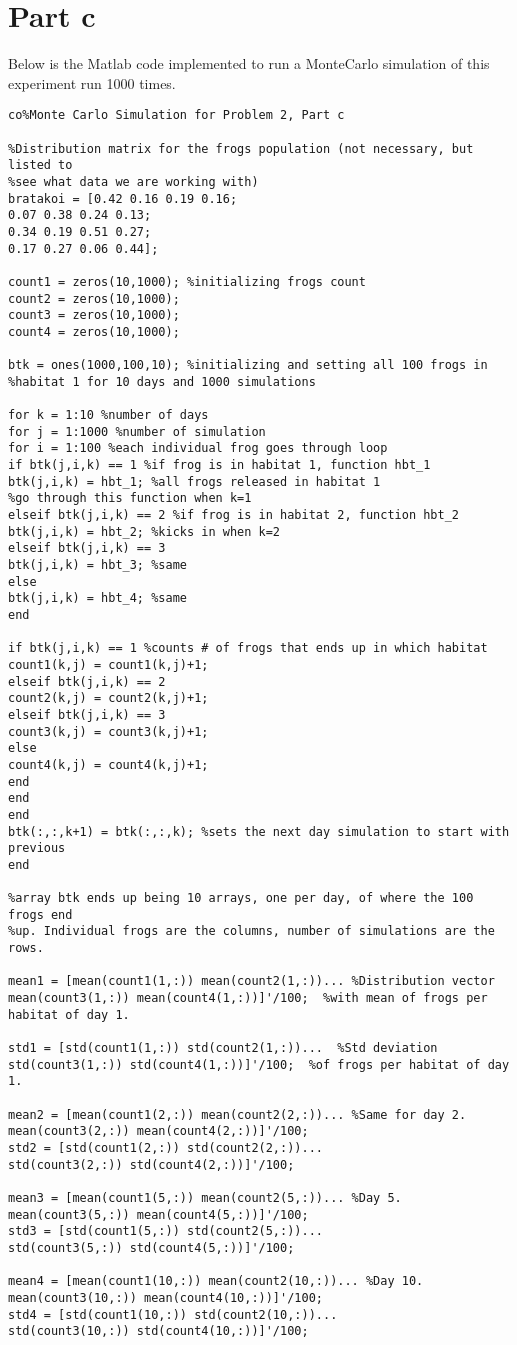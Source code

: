 \section{Part c}
Below is the Matlab code implemented to run a MonteCarlo simulation of this experiment run 1000 times.
\begin{lstlisting}[style=A]
co%Monte Carlo Simulation for Problem 2, Part c

%Distribution matrix for the frogs population (not necessary, but listed to
%see what data we are working with)
bratakoi = [0.42 0.16 0.19 0.16;
0.07 0.38 0.24 0.13;
0.34 0.19 0.51 0.27;
0.17 0.27 0.06 0.44]; 

count1 = zeros(10,1000); %initializing frogs count
count2 = zeros(10,1000);
count3 = zeros(10,1000);
count4 = zeros(10,1000);

btk = ones(1000,100,10); %initializing and setting all 100 frogs in 
%habitat 1 for 10 days and 1000 simulations

for k = 1:10 %number of days 
for j = 1:1000 %number of simulation
for i = 1:100 %each individual frog goes through loop
if btk(j,i,k) == 1 %if frog is in habitat 1, function hbt_1
btk(j,i,k) = hbt_1; %all frogs released in habitat 1 
%go through this function when k=1 
elseif btk(j,i,k) == 2 %if frog is in habitat 2, function hbt_2
btk(j,i,k) = hbt_2; %kicks in when k=2
elseif btk(j,i,k) == 3 
btk(j,i,k) = hbt_3; %same 
else 
btk(j,i,k) = hbt_4; %same
end

if btk(j,i,k) == 1 %counts # of frogs that ends up in which habitat
count1(k,j) = count1(k,j)+1; 
elseif btk(j,i,k) == 2
count2(k,j) = count2(k,j)+1;
elseif btk(j,i,k) == 3
count3(k,j) = count3(k,j)+1;
else
count4(k,j) = count4(k,j)+1;
end
end   
end
btk(:,:,k+1) = btk(:,:,k); %sets the next day simulation to start with previous
end

%array btk ends up being 10 arrays, one per day, of where the 100 frogs end
%up. Individual frogs are the columns, number of simulations are the rows.

mean1 = [mean(count1(1,:)) mean(count2(1,:))... %Distribution vector 
mean(count3(1,:)) mean(count4(1,:))]'/100;  %with mean of frogs per habitat of day 1.

std1 = [std(count1(1,:)) std(count2(1,:))...  %Std deviation
std(count3(1,:)) std(count4(1,:))]'/100;  %of frogs per habitat of day 1.

mean2 = [mean(count1(2,:)) mean(count2(2,:))... %Same for day 2.
mean(count3(2,:)) mean(count4(2,:))]'/100;
std2 = [std(count1(2,:)) std(count2(2,:))...
std(count3(2,:)) std(count4(2,:))]'/100;

mean3 = [mean(count1(5,:)) mean(count2(5,:))... %Day 5.
mean(count3(5,:)) mean(count4(5,:))]'/100;
std3 = [std(count1(5,:)) std(count2(5,:))...
std(count3(5,:)) std(count4(5,:))]'/100;

mean4 = [mean(count1(10,:)) mean(count2(10,:))... %Day 10.
mean(count3(10,:)) mean(count4(10,:))]'/100;
std4 = [std(count1(10,:)) std(count2(10,:))...
std(count3(10,:)) std(count4(10,:))]'/100;
\end{lstlisting}

